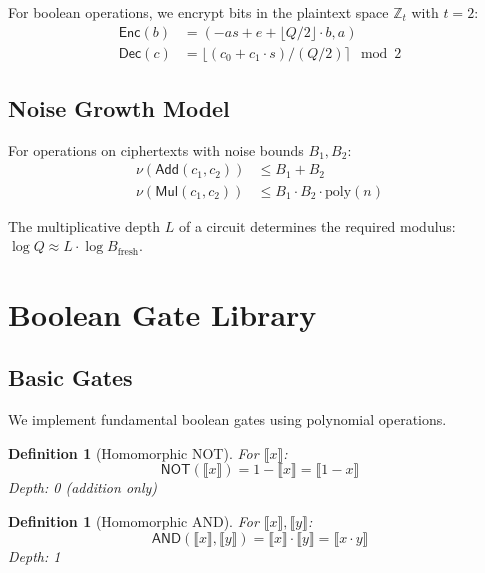 \documentclass[11pt,a4paper]{article}
\newtheorem{definition}[theorem]{Definition}
\begin{document}
For boolean operations, we encrypt bits in the plaintext space $\mathbb{Z}_t$ with $t = 2$:
\begin{align}
\textsf{Enc}(b) &= (-as + e + \lfloor Q/2 \rfloor \cdot b, a) \\
\textsf{Dec}(c) &= \lfloor (c_0 + c_1 \cdot s) / (Q/2) \rceil \mod 2
\end{align}

\subsection{Noise Growth Model}

For operations on ciphertexts with noise bounds $B_1, B_2$:
\begin{align}
\nu(\textsf{Add}(c_1, c_2)) &\leq B_1 + B_2 \\
\nu(\textsf{Mul}(c_1, c_2)) &\leq B_1 \cdot B_2 \cdot \text{poly}(n)
\end{align}

The multiplicative depth $L$ of a circuit determines the required modulus: $\log Q \approx L \cdot \log B_{\text{fresh}}$.

\section{Boolean Gate Library}

\subsection{Basic Gates}

We implement fundamental boolean gates using polynomial operations.

\begin{definition}[Homomorphic NOT]
For $\llbracket x \rrbracket$:
\begin{equation}
\textsf{NOT}(\llbracket x \rrbracket) = 1 - \llbracket x \rrbracket = \llbracket 1-x \rrbracket
\end{equation}
Depth: 0 (addition only)
\end{definition}

\begin{definition}[Homomorphic AND]
For $\llbracket x \rrbracket, \llbracket y \rrbracket$:
\begin{equation}
\textsf{AND}(\llbracket x \rrbracket, \llbracket y \rrbracket) = \llbracket x \rrbracket \cdot \llbracket y \rrbracket = \llbracket x \cdot y \rrbracket
\end{equation}
Depth: 1
\end{definition}
\end{document}
